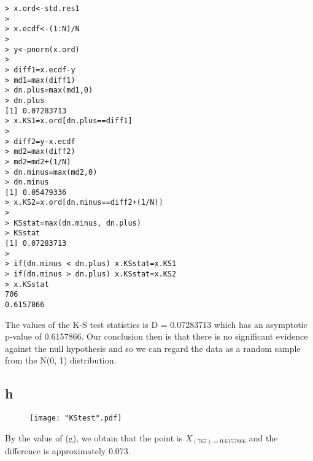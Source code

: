 \documentclass[12pt]{article}
\begin{document}
\begin{verbatim}
> x.ord<-std.res1
> 
> x.ecdf<-(1:N)/N
> 
> y<-pnorm(x.ord)
> 
> diff1=x.ecdf-y
> md1=max(diff1)
> dn.plus=max(md1,0)
> dn.plus
[1] 0.07283713
> x.KS1=x.ord[dn.plus==diff1]
> 
> diff2=y-x.ecdf
> md2=max(diff2)
> md2=md2+(1/N)
> dn.minus=max(md2,0)
> dn.minus
[1] 0.05479336
> x.KS2=x.ord[dn.minus==diff2+(1/N)]
> 
> KSstat=max(dn.minus, dn.plus)
> KSstat
[1] 0.07283713
> 
> if(dn.minus < dn.plus) x.KSstat=x.KS1
> if(dn.minus > dn.plus) x.KSstat=x.KS2
> x.KSstat
706 
0.6157866
\end{verbatim}
The values of the K-S test statistics is D = 0.07283713 which has an asymptotic p-value of 0.6157866. Our conclusion then is that there is no significant evidence against the null hypothesis and so we can regard the data as a random sample from the N(0, 1) distribution.



\subsection{h}
\begin{figure}[!htb]
	\centering
	\texttt{[image: "KStest".pdf]} 
	\caption{}
\end{figure}
By the value of (g), we obtain that the point is $X_{(767)=0.6157866}$ and the difference is approximately 0.073.




























 
\end{document}
